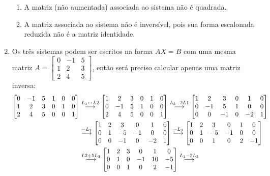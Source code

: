 \documentclass[12pt,a4paper]{article}
\newcommand{\grstep}[2][\relax]{%
   \ensuremath{\mathrel{
       {\mathop{\longrightarrow}\limits^{#2\mathstrut}_{
                                     \begin{subarray}{l} #1 \end{subarray}}}}}}
\newcommand{\swap}{\leftrightarrow}
\begin{document}
\begin{enumerate}
\begin{enumerate}
\item A matriz (não aumentada) associada ao sistema não é quadrada.
\item A matriz associada ao sistema não é inversível, pois sua forma escalonada reduzida não é a matriz identidade.
\end{enumerate}

\newpage
\item Os três sistemas podem ser escritos na forma $AX=B$ com uma mesma matriz $A = \begin{bmatrix}
0 & -1 & 5 \\
1 & 2 & 3 \\
2 & 4 & 5
\end{bmatrix}$, então será preciso calcular apenas uma matriz inversa:
\begin{align*}
\begin{bmatrix}
0 & -1 & 5 & 1 & 0 & 0\\
1 & 2 & 3 & 0 & 1 & 0\\
2 & 4 & 5 & 0 & 0 & 1
\end{bmatrix}
&
\grstep{ L_1 \swap L2 }
\begin{bmatrix}
1 & 2 & 3 & 0 & 1 & 0\\
0 & -1 & 5 & 1 & 0 & 0\\
2 & 4 & 5 & 0 & 0 & 1
\end{bmatrix}
\grstep{ L_3 - 2 L1 }
\begin{bmatrix}
1 & 2 & 3 & 0 & 1 & 0\\
0 & -1 & 5 & 1 & 0 & 0\\
0 & 0 & -1 & 0 & -2 & 1
\end{bmatrix} \\
&
\grstep{ -L_2 }
\begin{bmatrix}
1 & 2 & 3 & 0 & 1 & 0\\
0 & 1 & -5 & -1 & 0 & 0\\
0 & 0 & -1 & 0 & -2 & 1
\end{bmatrix}
\grstep{ -L_3 }
\begin{bmatrix}
1 & 2 & 3 & 0 & 1 & 0\\
0 & 1 & -5 & -1 & 0 & 0\\
0 & 0 & 1 & 0 & 2 & -1
\end{bmatrix} \\
&
\grstep{ L2+5L_3 }
\begin{bmatrix}
1 & 2 & 3 & 0 & 1 & 0\\
0 & 1 & 0 & -1 & 10 & -5\\
0 & 0 & 1 & 0 & 2 & -1
\end{bmatrix}
\grstep{ L_1-3L_3 }

\end{align*}
\end{enumerate}
\end{document}
